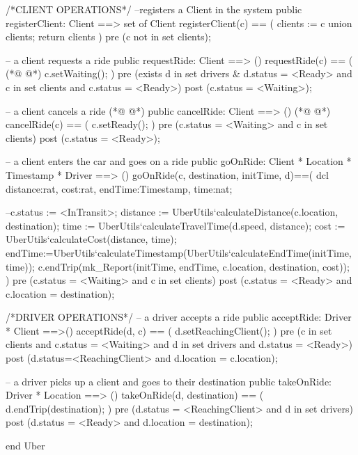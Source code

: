 \begin{vdmpp}[breaklines=true]
    /*CLIENT OPERATIONS*/
    --registers a Client in the system
    public registerClient: Client ==> set of Client
        registerClient(c) == (
            clients := {c} union clients;
            return clients
        )    
        pre (c not in set clients);
    
    -- a client requests a ride    
    public requestRide: Client ==> ()
        requestRide(c) == (
(*@
\label{acceptRide:76}
@*)
            c.setWaiting();
        )
        pre (exists d in set drivers & d.status = <Ready> and c in set clients and c.status = <Ready>)
        post (c.status = <Waiting>);
        
    -- a client cancels a ride 
(*@
\label{cancelRide:82}
@*)
    public cancelRide: Client ==> ()
(*@
\label{takeOnRide:83}
@*)
      cancelRide(c) == (
        c.setReady();
      )
      pre (c.status = <Waiting> and c in set clients)
        post (c.status = <Ready>);
        
    -- a client enters the car and goes on a ride
    public goOnRide: Client * Location * Timestamp * Driver ==> ()
        goOnRide(c, destination, initTime, d)==(
            dcl distance:rat, cost:rat, endTime:Timestamp, time:nat;
            
            --c.status := <InTransit>;
            distance := UberUtils`calculateDistance(c.location, destination);
            time := UberUtils`calculateTravelTime(d.speed, distance);
            cost := UberUtils`calculateCost(distance, time);
            endTime:=UberUtils`calculateTimestamp(UberUtils`calculateEndTime(initTime, time));
            c.endTrip(mk_Report(initTime, endTime, c.location, destination, cost));
        ) pre (c.status = <Waiting> and c in set clients) 
        post (c.status = <Ready> and c.location = destination);
    
    /*DRIVER OPERATIONS*/
    -- a driver accepts a ride
    public acceptRide: Driver * Client ==>()
        acceptRide(d, c) == (
            d.setReachingClient();
        )    
        pre (c in set clients and c.status = <Waiting> and d in set drivers and d.status = <Ready>)
        post (d.status=<ReachingClient> and d.location = c.location); 
    
    -- a driver picks up a client and goes to their destination
    public takeOnRide: Driver * Location ==> ()
        takeOnRide(d, destination) == (
         d.endTrip(destination);
        )
        pre (d.status = <ReachingClient> and d in set drivers)
        post (d.status = <Ready> and d.location = destination);
    
end Uber
\end{vdmpp}
